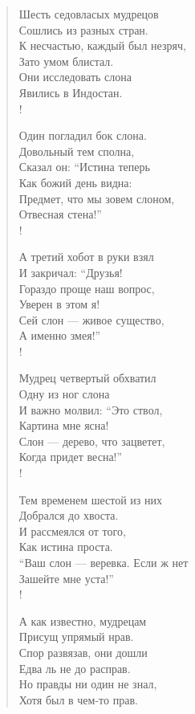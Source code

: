 \documentclass{../../text-style}
\begin{document}
\begin{verse}
    Шесть седовласых мудрецов \\
    Сошлись из разных стран. \\
    К несчастью, каждый был незряч, \\
    Зато умом блистал. \\
    Они исследовать слона \\
    Явились в Индостан. \\!

    Один погладил бок слона. \\
    Довольный тем сполна, \\
    Сказал он: ``Истина теперь \\
    Как божий день видна: \\
    Предмет, что мы зовем слоном, ­\\
    Отвесная стена!'' \\!

    А третий хобот в руки взял \\
    И закричал: ``Друзья! \\
    Гораздо проще наш вопрос, \\
    Уверен в этом я! \\
    Сей слон --- живое существо, \\
    А именно змея!'' \\!

    Мудрец четвертый обхватил \\
    Одну из ног слона \\
    И важно молвил: ``Это ствол, \\
    Картина мне ясна! \\
    Слон --- дерево, что зацветет, \\
    Когда придет весна!'' \\!

    Тем временем шестой из них \\
    Добрался до хвоста. \\
    И рассмеялся от того, \\
    Как истина проста. \\
    ``Ваш слон --- веревка. Если ж нет \\
    Зашейте мне уста!'' \\!

    А как известно, мудрецам \\
    Присущ упрямый нрав. \\
    Спор развязав, они дошли \\
    Едва ль не до расправ. \\
    Но правды ни один не знал, \\
    Хотя был в чем-то прав.
\end{verse}
\end{document}
